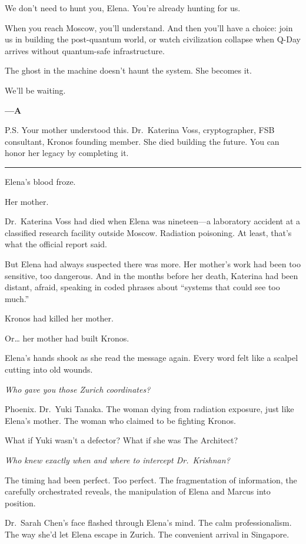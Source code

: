 We don't need to hunt you, Elena. You're already hunting for us.

When you reach Moscow, you'll understand. And then you'll have a choice: join us in building the post-quantum world, or watch civilization collapse when Q-Day arrives without quantum-safe infrastructure.

The ghost in the machine doesn't haunt the system. She becomes it.

We'll be waiting.

\textbf{---A}

P.S. Your mother understood this. Dr.~Katerina Voss, cryptographer, FSB consultant, Kronos founding member. She died building the future. You can honor her legacy by completing it.

\begin{center}\rule{0.5\linewidth}{0.5pt}\end{center}

Elena's blood froze.

Her mother.

Dr.~Katerina Voss had died when Elena was nineteen---a laboratory accident at a classified research facility outside Moscow. Radiation poisoning. At least, that's what the official report said.

But Elena had always suspected there was more. Her mother's work had been too sensitive, too dangerous. And in the months before her death, Katerina had been distant, afraid, speaking in coded phrases about ``systems that could see too much.''

Kronos had killed her mother.

Or\ldots{} her mother had built Kronos.

Elena's hands shook as she read the message again. Every word felt like a scalpel cutting into old wounds.

\emph{Who gave you those Zurich coordinates?}

Phoenix. Dr.~Yuki Tanaka. The woman dying from radiation exposure, just like Elena's mother. The woman who claimed to be fighting Kronos.

What if Yuki wasn't a defector? What if she was The Architect?

\emph{Who knew exactly when and where to intercept Dr.~Krishnan?}

The timing had been perfect. Too perfect. The fragmentation of information, the carefully orchestrated reveals, the manipulation of Elena and Marcus into position.

Dr.~Sarah Chen's face flashed through Elena's mind. The calm professionalism. The way she'd let Elena escape in Zurich. The convenient arrival in Singapore.

